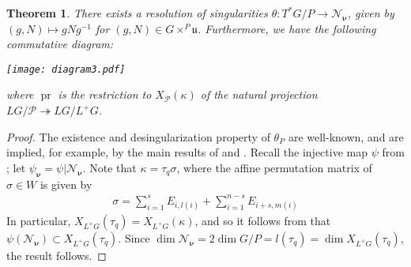 \documentclass[paper=a4, fontsize=10pt]{amsart} %
\theoremstyle{plain}
\newtheorem{theorem}[subsection]{Theorem}
\theoremstyle{definition}
\theoremstyle{remark}
\numberwithin{equation}{section} %
\numberwithin{figure}{section} %
\numberwithin{table}{section} %
\numberwithin{subsection}{section} %
\newif\ifdraft
\def\borel{\ensuremath{B}}
\def\gl{\ensuremath{G}}
\def\gL{\ensuremath{L\gl}}
\def\gLhat{\gL}
\def\gOhat{\ensuremath{L^+\gl}}
\def\para{\ensuremath{P}}
\def\Para{\ensuremath{\mathcal P}}
\def\u{\ensuremath{\mathfrak u}}
\def\E{\ensuremath{E}}
\def\betac{\ensuremath{q}}
\def\Ni{\ensuremath{\mathcal N}}
\def\thetav{\ensuremath{\theta_P}}
\begin{document}
\fi
\ifminuscule
\begin{theorem}
\label{springer2}
\label{lusztig}
There exists a resolution of singularities $\theta:T^*\gl/\para\rightarrow\Ni_{\boldsymbol\nu}$, given by $(g,N)\mapsto gNg^{-1}$ for $(g,N)\in\gl\times^\para\u$.
Furthermore, we have the following commutative diagram:\begin{center}
\texttt{[image: diagram3.pdf]}
\end{center}
where $\operatorname{pr}$ is the restriction to $X_\Para(\kappa)$ of the natural projection $\gLhat/\Para\twoheadrightarrow\gLhat/\gOhat$.
\ifdraft\marginpar{The map $\psi_\nu$ is an open embedding.}\fi 
\end{theorem}
\fi
\ifminuscule
\begin{proof}
\label{sigma}
The existence and desingularization property of $\theta_P$ are well-known, and are implied, for example, by the main results of \cite{he} and \cite{fu}.
Recall the injective map $\psi$ from ; let $\psi_{\boldsymbol\nu}=\psi|\Ni_{\boldsymbol\nu}$.
Note that $\kappa=\tau_\betac\sigma$, where the affine permutation matrix of $\sigma\in W$ is given by \begin{align}
\label{form:sigma}
    \sigma=\sum\limits_{i=1}^{s}\E_{i,l(i)}+\sum\limits_{i=1}^{n-s}\E_{i+s,m(i)}
\end{align}
In particular, $X_{\gOhat}(\tau_\betac)=X_{\gOhat}(\kappa)$, and so it follows from  that $\psi(\Ni_{\boldsymbol\nu})\subset X_{\gOhat}(\tau_\betac)$.
Since $\dim\Ni_{\boldsymbol\nu}=2\dim\gl/\para=l(\tau_\betac)=\dim X_{\gOhat}(\tau_\betac)$, the result follows.
\end{proof}
\fi
\end{document}
